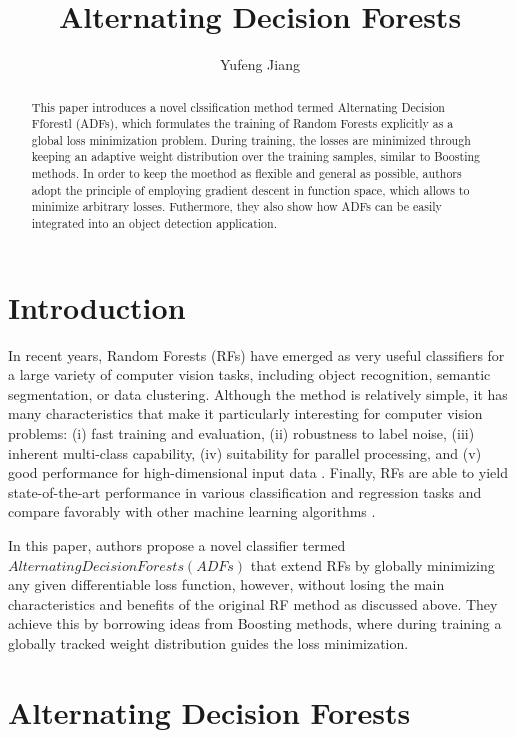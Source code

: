 \documentclass[10pt,twocolumn,letterpaper]{article}
\begin{document}
\title{Alternating Decision Forests}
\author{Yufeng Jiang}
\maketitle
\balance

\begin{abstract}
This paper introduces a novel clssification method termed Alternating Decision Fforestl (ADFs), which formulates the training of Random Forests explicitly as a global loss minimization problem. During training, the losses are minimized through keeping an adaptive weight distribution over the training samples, similar to Boosting methods. In order to keep the moethod as flexible and general as possible, authors adopt the principle of employing gradient descent in function space, which allows to minimize arbitrary losses. Futhermore, they also show how ADFs can be easily integrated into an object detection application.
\end{abstract}

\section{Introduction}

In recent years, Random Forests \cite{Shape,Consistency} (RFs) have emerged as very useful classifiers for a large variety of computer vision tasks, including object recognition, semantic segmentation, or data clustering. Although the method is relatively simple, it has many characteristics that make it particularly interesting for computer vision problems: (i) fast training and evaluation, (ii) robustness to label noise, (iii) inherent multi-class capability, (iv) suitability for parallel processing, and (v) good performance for high-dimensional input data \cite{An}. Finally, RFs are able to yield state-of-the-art performance in various classification and regression tasks and compare favorably with other machine learning algorithms \cite{The}.

In this paper, authors propose a novel classifier termed $Alternating Decision Forests (ADFs)$ that extend RFs by globally minimizing any given differentiable loss function, however, without losing the main characteristics and benefits of the original RF method as discussed above. They achieve this by borrowing ideas from Boosting methods, where during training a globally tracked weight distribution guides the loss minimization.

\section{Alternating Decision Forests}
\end{document}
